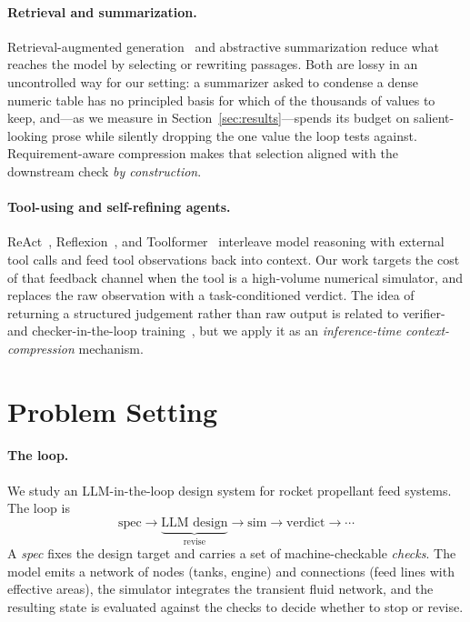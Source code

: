 \documentclass[10pt,twocolumn]{article}
\begin{document}
\paragraph{Retrieval and summarization.}
Retrieval-augmented generation~\cite{lewis2020rag} and abstractive summarization
reduce what reaches the model by selecting or rewriting passages. Both are lossy in
an uncontrolled way for our setting: a summarizer asked to condense a dense numeric
table has no principled basis for which of the thousands of values to keep, and---as
we measure in Section~\ref{sec:results}---spends its budget on salient-looking
prose while silently dropping the one value the loop tests against. Requirement-aware
compression makes that selection aligned with the downstream check \emph{by
construction}.

\paragraph{Tool-using and self-refining agents.}
ReAct~\cite{yao2023react}, Reflexion~\cite{shinn2023reflexion}, and
Toolformer~\cite{schick2023toolformer} interleave model reasoning with external
tool calls and feed tool observations back into context. Our work targets the cost
of that feedback channel when the tool is a high-volume numerical simulator, and
replaces the raw observation with a task-conditioned verdict. The idea of returning
a structured judgement rather than raw output is related to verifier- and
checker-in-the-loop training~\cite{cobbe2021verifiers}, but we apply it as an
\emph{inference-time context-compression} mechanism.

\section{Problem Setting}
\label{sec:problem}

\paragraph{The loop.}
We study an LLM-in-the-loop design system for rocket propellant feed systems. The
loop is
\[\textstyle
\text{spec}\to\underbrace{\text{LLM design}}_{\text{revise}}\to\text{sim}
\to\text{verdict}\to\cdots
\]
A \emph{spec} fixes the design target and carries a set of machine-checkable
\emph{checks}. The model emits a network of nodes (tanks, engine) and connections
(feed lines with effective areas), the simulator integrates the transient fluid
network, and the resulting state is evaluated against the checks to decide whether
to stop or revise.
\end{document}
